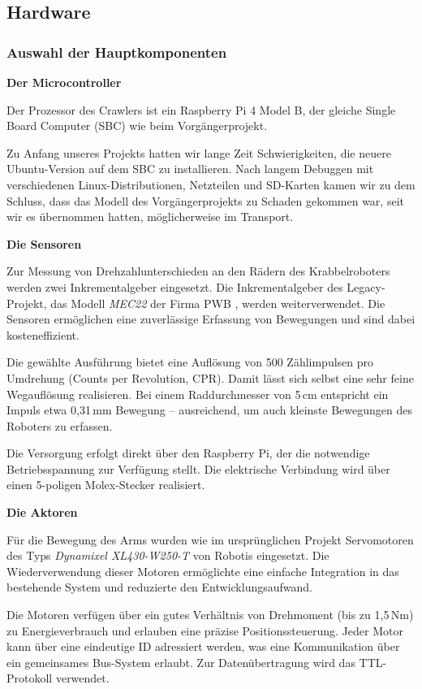 \subsection{Hardware}

\subsubsection{Auswahl der Hauptkomponenten}

\textbf{Der Microcontroller}

Der Prozessor des Crawlers ist ein Raspberry Pi 4 Model B, der gleiche Single Board Computer (SBC) wie beim Vorgängerprojekt.

Zu Anfang unseres Projekts hatten wir lange Zeit Schwierigkeiten, die neuere Ubuntu-Version auf dem SBC zu installieren. Nach langem Debuggen mit verschiedenen Linux-Distributionen, Netzteilen und SD-Karten kamen wir zu dem Schluss, dass das Modell des Vorgängerprojekts zu Schaden gekommen war, seit wir es übernommen hatten, möglicherweise im Transport.

\textbf{Die Sensoren}

Zur Messung von Drehzahlunterschieden an den Rädern des Krabbelroboters werden zwei Inkrementalgeber eingesetzt. Die Inkrementalgeber des Legacy-Projekt, das Modell \textit{MEC22} der Firma PWB \cite{pwb_me16_datasheet_2011}, werden weiterverwendet. Die Sensoren ermöglichen eine zuverlässige Erfassung von Bewegungen und sind dabei kosteneffizient.

Die gewählte Ausführung bietet eine Auflösung von 500 Zählimpulsen pro Umdrehung (Counts per Revolution, CPR). Damit lässt sich selbst eine sehr feine Wegauflösung realisieren. Bei einem Raddurchmesser von 5\,cm entspricht ein Impuls etwa 0{,}31\,mm Bewegung – ausreichend, um auch kleinste Bewegungen des Roboters zu erfassen.

Die Versorgung erfolgt direkt über den Raspberry Pi, der die notwendige Betriebsspannung zur Verfügung stellt. Die elektrische Verbindung wird über einen 5-poligen Molex-Stecker realisiert.

\textbf{Die Aktoren}

Für die Bewegung des Arms wurden wie im ursprünglichen Projekt Servomotoren des Typs \textit{Dynamixel XL430-W250-T} von Robotis \cite{robotis_xl430} eingesetzt. Die Wiederverwendung dieser Motoren ermöglichte eine einfache Integration in das bestehende System und reduzierte den Entwicklungsaufwand. 

Die Motoren verfügen über ein gutes Verhältnis von Drehmoment (bis zu 1{,}5\,Nm) zu Energieverbrauch und erlauben eine präzise Positionssteuerung. Jeder Motor kann über eine eindeutige ID adressiert werden, was eine Kommunikation über ein gemeinsames Bus-System erlaubt. Zur Datenübertragung wird das TTL-Protokoll verwendet.

